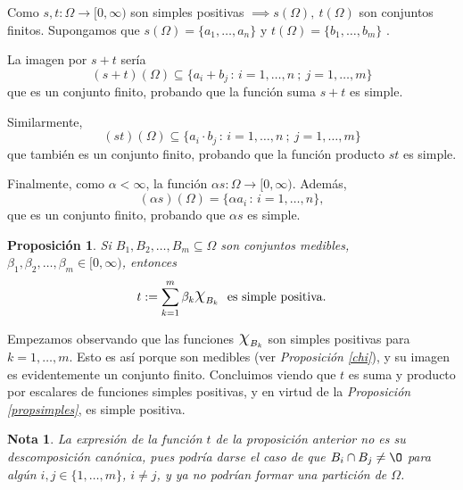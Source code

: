 \documentclass[11pt, a4paper]{article}
\makeatletter
\newif\IfInSansMode
\let\oldsf\sffamily
\renewcommand*{\sffamily}{\oldsf\mathversion{sans}\InSansModetrue}
\let\oldnorm\normalfont
\renewcommand*{\normalfont}{\oldnorm\InSansModefalse\mathversion{normal}}
\DeclareRobustCommand{\rchi}{{\Large \mathpalette\irchi\relax}}
\newcommand{\irchi}[2]{\raisebox{0.4\depth}{$#1\chi$}} %
\renewenvironment{proof}[1][\proofname] {\par\pushQED{\qed}\normalfont\topsep6\p@\@plus6\p@\relax\trivlist\item[\hskip\labelsep\itshape\sffamily#1\@addpunct{.}]\ignorespaces}{\popQED\endtrivlist\@endpefalse}
\theoremstyle{theorem-style}
\newtheorem{nprop}{Proposición}[section]
\theoremstyle{definition-style}
\theoremstyle{remark-style}
\newtheorem*{nota}{Nota}
\theoremstyle{example-style}
\makeatother
\begin{document}
  \begin{proof}
    Como $s,t: \Omega \longrightarrow [0,\infty)$ son simples positivas $\implies s(\Omega) , \ t(\Omega)$ son conjuntos finitos. Supongamos que $s(\Omega) =\{ a_1, \dots ,a_n\}$  y $t(\Omega) = \{ b_1, \dots ,b_m\}$ . 

    La imagen por $s+ t$ sería
    $$(s+t)(\Omega) \subseteq \{ a_i + b_j \, :\, i=1,\dots ,n \ ; \ j=1,\dots ,m\}$$
    que es un conjunto finito, probando que la función suma $s+t$ es simple.

    Similarmente, $$(st)(\Omega ) \subseteq \{ a_i \cdot b_j \, : \, i=1,\dots ,n \ ; \ j=1,\dots ,m \}$$
    que también es un conjunto finito, probando que la función producto $st$ es simple.

    Finalmente, como $\alpha< \infty$, la función $\alpha s:\Omega \longrightarrow [0,\infty)$. Además, 
    $$(\alpha s)(\Omega) = \{ \alpha a_i \,:\, i=1,\dots ,n \},$$
    que es un  conjunto finito, probando que $\alpha s$ es simple.
  \end{proof}

\begin{nprop} \label{caract_simples}
Si $B_1, B_2,\dots ,B_m \subseteq \Omega$ son conjuntos medibles,
$\beta_1,\beta_2,\dots,\beta_m \in[0,\infty)$, entonces $$t:= \sum_{k=1}^{m}  \beta_k \rchi_{B_k} \ \ \text{es simple positiva.}$$
\end{nprop}

\begin{proof}
	Empezamos observando que las funciones $\rchi_{B_k}$ son simples positivas para $k=1,\dots,m$. Esto es así porque son medibles (ver \textit{Proposición \ref{chi}}), y su imagen es evidentemente un conjunto finito. Concluimos viendo que $t$ es suma y producto por escalares de funciones simples positivas, y en virtud de la \textit{Proposición \ref{propsimples}}, es simple positiva.
\end{proof}

\begin{nota}
	La expresión de la función $t$ de la proposición anterior no es su descomposición canónica, pues podría darse el caso de que $B_i \cap B_j \neq \O$ para algún $i,j \in \{1,\dots,m\}$, $i\neq j$, y ya no podrían formar una partición de $\Omega$.
\end{nota}
\end{document}
